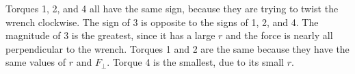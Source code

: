 Torques 1, 2, and 4 all have the same sign, because they are trying
to twist the wrench clockwise. The sign of 3 is opposite to the signs
of 1, 2, and 4. The magnitude of 3 is the greatest, since it has a
large $r$ and the force is nearly all perpendicular to the wrench.
Torques 1 and 2 are the same because they have the same values of $r$
and $F_{\perp}$. Torque 4 is the smallest, due to its small $r$.
